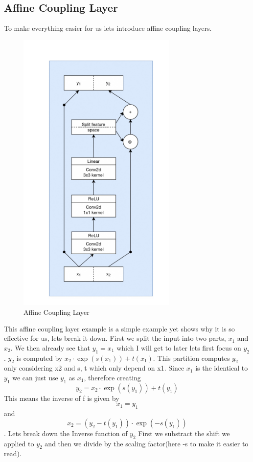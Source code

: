 \documentclass[a4paper]{article}
\begin{document}
\subsection{Affine Coupling Layer}
To make everything easier for us lets introduce affine coupling layers. \begin{figure}
    \centering
    \includegraphics[width=0.7\textwidth]{images/affine_coupling_layer.png}
    \caption{Affine Coupling Layer}
    \label{fig:Affine Coupling Layer}
\end{figure}
This affine coupling layer example is a simple example yet shows why it is so effective for us, lets break it down. First we split the input into two parts, $x_1$ and $x_2$. We then already see that $y_1 = x_1 $ which I will get to later lets first focus on $y_2$. $y_2$ is computed by $x_2 \cdot \exp(s(x_1)) + t(x_1)$. This partition computes
$y_{2}$ only considering x2 and s, t which only depend on x1. Since $x_1$ is the identical to $y_1$ we can just use $y_1$ as $x_1$, therefore creating $$y_2 =  x_{2} \cdot \exp(s(y_1)) + t(y_1)$$ This means the inverse of f is given by $$x_1 = y_1$$ and $$x_2 = (y_2 - t(y_1)) \cdot \exp(-s(y_1))$$. Lets break down the Inverse function of $y_2$
First we substract the shift we applied to $y_2$ and then we divide by the scaling factor(here -s to make it easier to read). 
\end{document}
